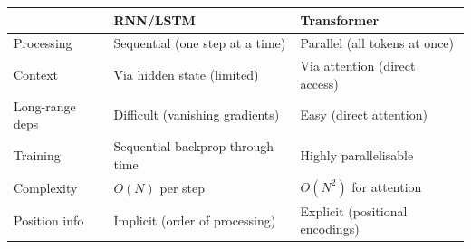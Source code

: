 \begin{center}
\renewcommand{\arraystretch}{1.3}
\begin{tabular}{@{} l p{5cm} p{5cm} @{}}
\toprule
& \textbf{RNN/LSTM} & \textbf{Transformer} \\
\midrule
Processing & Sequential (one step at a time) & Parallel (all tokens at once) \\
Context & Via hidden state (limited) & Via attention (direct access) \\
Long-range deps & Difficult (vanishing gradients) & Easy (direct attention) \\
Training & Sequential backprop through time & Highly parallelisable \\
Complexity & $O(N)$ per step & $O(N^2)$ for attention \\
Position info & Implicit (order of processing) & Explicit (positional encodings) \\
\bottomrule
\end{tabular}
\end{center}

